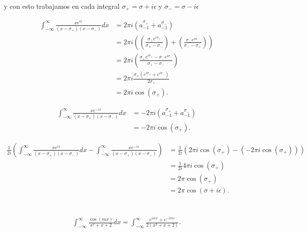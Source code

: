 \documentclass{report}
\begin{document}
\begin{enumerate}
      y con esto trabajamos en cada integral $\sigma_{+}=\sigma + i\epsilon$ y $\sigma_{-}=\sigma - i\epsilon$

      \begin{align*}
	\int_{-\infty}^{\infty}\frac{xe^{ix}}{\left( x - \sigma_{+} \right) \left( x - \sigma_{-} \right) }dx &= 2\pi i \left( a_{-1}^{\sigma_{+}}+ a_{-1}^{\sigma_{-}} \right) \\
	&= 2\pi i \left( \left( \frac{\sigma_{+}e^{i\sigma_{+}}}{\sigma_{+}-\sigma_{-}} \right) + \left( \frac{\sigma_{-}e^{i\sigma_{-}}}{\sigma_{-}-\sigma_{+}} \right)  \right)  \\
	&= 2\pi i\left( \frac{\sigma_{+}e^{i\sigma_{+}}-\sigma_{-}e^{i\sigma_{-}}}{\sigma_{+}-\sigma_{-}} \right)  \\
	&= 2\pi i \frac{\sigma_{+}\left( e^{i\sigma_{+}}+e^{i\sigma_{-}} \right) }{2\sigma_{+}} \\
	&= 2\pi i \cos\left( \sigma_{+} \right)
      .\end{align*}

      \begin{align*}
	\int_{-\infty}^{\infty}\frac{xe^{-ix}}{\left( x-\sigma_{+} \right) \left( x-\sigma_{-} \right) } dx &= -2\pi i\left( a_{-1}^{\sigma_{+}}+a_{-1}^{\sigma_{-}} \right)  \\
	&= -2\pi i\cos\left( \sigma_{+} \right)
      .\end{align*}

      \begin{align*}
        \frac{1}{2i}\left( \int_{-\infty}^{\infty}\frac{xe^{ix}}{\left( x-\sigma_{+} \right) \left( x-\sigma_{-} \right) }dx - \int_{-\infty}^{\infty}\frac{xe^{-ix}}{\left( x-\sigma_{+} \right) \left( x-\sigma_{-} \right) } \right) &= \frac{1}{2i}\left( 2 \pi i \cos\left( \sigma_{+} \right) - \left( -2\pi i \cos\left( \sigma_{+} \right)  \right)  \right)  \\
	&= \frac{1}{2i}4\pi i\cos\left( \sigma_{+} \right)  \\
	&= 2\pi \cos\left( \sigma_{+} \right)  \\
	&= 2\pi \cos\left( \sigma + i\epsilon \right)
      .\end{align*}
  \end{enumerate}

  \chapter{}
  
  \begin{align*}
    \int_{-\infty}^{\infty}\frac{\cos\left( mx \right) }{x^2+x+2}dx=\int_{-\infty}^{\infty}\frac{e^{imx}+e^{-imx}}{2\left( x^2+x+2 \right) }
  .\end{align*}
\end{document}
